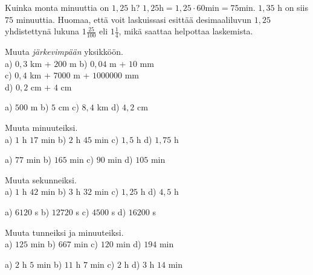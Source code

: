 
\begin{esimerkki}
Kuinka monta minuuttia on $1,25$ h? $1,25 \text{h} = 1,25 \cdot 60 \text{min} = 75 \text{min}$. $1,35$ h on siis $75$ minuuttia. Huomaa, että voit laskuissasi esittää desimaaliluvun $1,25$ yhdistettynä lukuna $1 \frac{25}{100}$ eli $1 \frac{1}{4}$, mikä saattaa helpottaa laskemista.
\end{esimerkki}

\begin{esimerkki}
\begin{tehtava}
Muuta \emph{järkevimpään} yksikköön. \\
a) $0,3$ km + $200$ m \qquad
b) $0,04$ m + $10$ mm \\
c) $0,4$ km + $7000$ m + $1000000$ mm \\
d) $0,2$ cm + $4$ cm
\begin{vastaus}
a) $500$ m \qquad
b) $5$ cm \qquad
c) $8,4$ km \qquad
d) $4,2$ cm
\end{vastaus}
\end{tehtava}
\end{esimerkki}

\begin{esimerkki}
\end{esimerkki}

\begin{tehtava}
Muuta minuuteiksi. \\
a) $1$ h $17$ min \qquad
b) $2$ h $45$ min \qquad
c) $1,5$ h \qquad
d) $1,75$ h
\begin{vastaus}
a) $77$ min \qquad
b) $165$ min \qquad
c) $90$ min \qquad
d) $105$ min
\end{vastaus}
\end{tehtava}

\begin{tehtava}
Muuta sekunneiksi. \\
a) $1$ h $42$ min \qquad
b) $3$ h $32$ min \qquad
c) $1,25$ h \qquad
d) $4,5$ h
\begin{vastaus}
a) $6120$ s \qquad
b) $12720$ s \qquad
c) $4500$ s \qquad
d) $16200$ s
\end{vastaus}
\end{tehtava}

\begin{tehtava}
Muuta tunneiksi ja minuuteiksi. \\
a) $125$ min \qquad
b) $667$ min \qquad
c) $120$ min \qquad
d) $194$ min
\begin{vastaus}
a) $2$ h $5$ min \qquad
b) $11$ h $7$ min \qquad
c) $2$ h \qquad
d) $3$ h $14$ min
\end{vastaus}
\end{tehtava}

